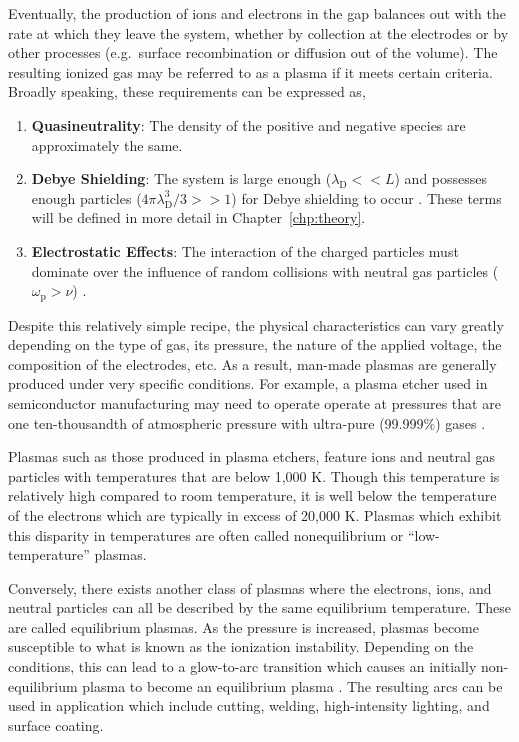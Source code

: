 Eventually, the production of ions and electrons in the gap balances out with
the rate at which they leave the system, whether by collection at the electrodes
or by other processes (e.g.\ surface recombination or diffusion out of the
volume). The resulting ionized gas may be referred to as a plasma if it meets
certain criteria. Broadly speaking, these requirements can be expressed as,
\begin{enumerate}
  \item \textbf{Quasineutrality}: The density of the positive and negative
species are approximately the same.
  \item \textbf{Debye Shielding}: The system is large enough ($\lambda_\mathrm{D} 
<< L$) and possesses enough particles ($4\pi\lambda_\mathrm{D}^3/3 >> 1$) for
Debye shielding to occur \cite{Chen1984}. These terms will be defined in more
detail in Chapter~\ref{chp:theory}.
  \item \textbf{Electrostatic Effects}: The interaction of the charged particles
must dominate over the influence of random collisions with neutral gas particles
($\omega_\mathrm{p} > \nu$) \cite{Chen1984}.
\end{enumerate}

Despite this relatively simple recipe, the physical characteristics can vary
greatly depending on the type of gas, its pressure, the nature of the applied
voltage, the composition of the electrodes, etc. As a result, man-made plasmas
are generally produced under very specific conditions. For example, a plasma
etcher used in semiconductor manufacturing may need to operate operate at
pressures that are one ten-thousandth of atmospheric pressure with ultra-pure
(99.999\%) gases \cite{Greenberg1993a}.

Plasmas such as those produced in plasma etchers, feature ions and neutral gas
particles with temperatures that are below 1,000 K. Though this temperature is
relatively high compared to room temperature, it is well below the temperature
of the electrons which are typically in excess of 20,000 K. Plasmas which
exhibit this disparity in temperatures are often called nonequilibrium or
``low-temperature'' plasmas.

Conversely, there exists another class of plasmas where the electrons, ions, and
neutral particles can all be described by the same equilibrium temperature.
These are called equilibrium plasmas. As the pressure is increased, plasmas
become susceptible to what is known as the ionization instability. Depending on
the conditions, this can lead to a glow-to-arc transition which causes an
initially non-equilibrium plasma to become an equilibrium plasma
\cite{Kunhardt2000}. The resulting arcs can be used in application which include
cutting, welding, high-intensity lighting, and surface coating.

